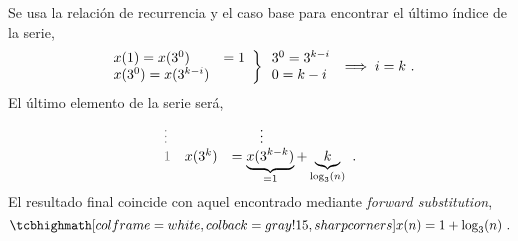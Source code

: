 \begin{enumerate}[label=\textbf{\alph*.}]
\begin{solution}
\begin{equation*}
        \end{equation*}
        Se usa la relación de recurrencia y el caso base para encontrar el último índice de la serie,
        \begin{equation*}
            \begin{rcases}
                \begin{array}{l l}
                    x(1) = x(3^0) & = 1 \\
                    x(3^0) = x(3^{k - i})
                \end{array}
            \end{rcases}
            \begin{array}{l}
                3^0 = 3^{k - i} \\
                0 = k - i
            \end{array}
            \implies i = k\ .
        \end{equation*}
        El último elemento de la serie será,
        \begin{equation*}
            \begin{array}{l l l}
                \txtgray\vdots & & \qquad\vdots \\
                \txtgray{1} & x(3^k) & = \underbrace{x(3^{k - k})}_{=1} + \underbrace{k}_{\log_{3}(n)}\ .
            \end{array}
        \end{equation*}
        El resultado final coincide con aquel encontrado mediante \textit{forward substitution},
        \begin{equation}
            \result{x(n) = 1 + \log_{3}(n)\ .}
        \end{equation}
    \end{solution}
\end{enumerate}
